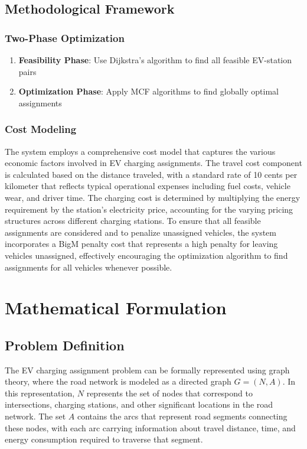 \documentclass[12pt,a4paper]{article}
\begin{document}
\subsection{Methodological Framework}

\subsubsection{Two-Phase Optimization}
\begin{enumerate}
    \item \textbf{Feasibility Phase}: Use Dijkstra's algorithm to find all feasible EV-station pairs
    \item \textbf{Optimization Phase}: Apply MCF algorithms to find globally optimal assignments
\end{enumerate}

\subsubsection{Cost Modeling}

The system employs a comprehensive cost model that captures the various economic factors involved in EV charging assignments. The travel cost component is calculated based on the distance traveled, with a standard rate of 10 cents per kilometer that reflects typical operational expenses including fuel costs, vehicle wear, and driver time. The charging cost is determined by multiplying the energy requirement by the station's electricity price, accounting for the varying pricing structures across different charging stations. To ensure that all feasible assignments are considered and to penalize unassigned vehicles, the system incorporates a BigM penalty cost that represents a high penalty for leaving vehicles unassigned, effectively encouraging the optimization algorithm to find assignments for all vehicles whenever possible.

\section{Mathematical Formulation}

\subsection{Problem Definition}

The EV charging assignment problem can be formally represented using graph theory, where the road network is modeled as a directed graph $G = (N, A)$. In this representation, $N$ represents the set of nodes that correspond to intersections, charging stations, and other significant locations in the road network. The set $A$ contains the arcs that represent road segments connecting these nodes, with each arc carrying information about travel distance, time, and energy consumption required to traverse that segment.
\end{document}
